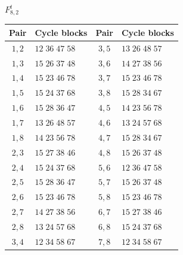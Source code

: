 \documentclass[11pt,a4paper]{article}
\theoremstyle{plain}
\theoremstyle{definition}
\numberwithin{equation}{section}
\begin{document}
\begin{center}\small
$F_{8,2}^{t}$\par\nopagebreak[4]\smallskip\nopagebreak[4]
\begin{tabular}{cl@{\qquad}cl}\toprule Pair&Cycle blocks&Pair&Cycle blocks\\\midrule
$1,2$ & $12\;36\;47\;58$ & $3,5$ & $13\;26\;48\;57$ \\
$1,3$ & $15\;26\;37\;48$ & $3,6$ & $14\;27\;38\;56$ \\
$1,4$ & $15\;23\;46\;78$ & $3,7$ & $15\;23\;46\;78$ \\
$1,5$ & $15\;24\;37\;68$ & $3,8$ & $15\;28\;34\;67$ \\
$1,6$ & $15\;28\;36\;47$ & $4,5$ & $14\;23\;56\;78$ \\
$1,7$ & $13\;26\;48\;57$ & $4,6$ & $13\;24\;57\;68$ \\
$1,8$ & $14\;23\;56\;78$ & $4,7$ & $15\;28\;34\;67$ \\
$2,3$ & $15\;27\;38\;46$ & $4,8$ & $15\;26\;37\;48$ \\
$2,4$ & $15\;24\;37\;68$ & $5,6$ & $12\;36\;47\;58$ \\
$2,5$ & $15\;28\;36\;47$ & $5,7$ & $15\;26\;37\;48$ \\
$2,6$ & $15\;23\;46\;78$ & $5,8$ & $15\;23\;46\;78$ \\
$2,7$ & $14\;27\;38\;56$ & $6,7$ & $15\;27\;38\;46$ \\
$2,8$ & $13\;24\;57\;68$ & $6,8$ & $15\;24\;37\;68$ \\
$3,4$ & $12\;34\;58\;67$ & $7,8$ & $12\;34\;58\;67$ \\
\bottomrule\end{tabular}
\end{center}
\end{document}
